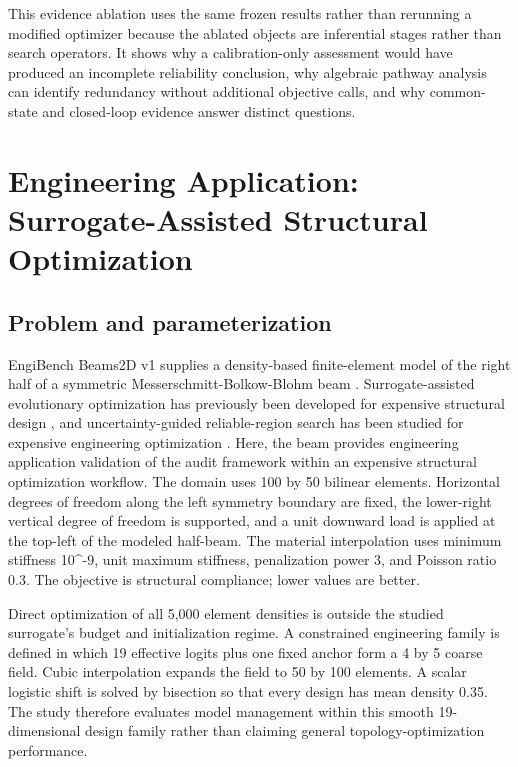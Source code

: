 \documentclass[]{interact}
\begin{document}
\endgroup

This evidence ablation uses the same frozen results rather than rerunning a modified optimizer because the ablated objects are inferential stages rather than search operators. It shows why a calibration-only assessment would have produced an incomplete reliability conclusion, why algebraic pathway analysis can identify redundancy without additional objective calls, and why common-state and closed-loop evidence answer distinct questions.

\hypertarget{engineering-application-surrogate-assisted-structural-optimization}{%
\section{Engineering Application: Surrogate-Assisted Structural Optimization}\label{engineering-application-surrogate-assisted-structural-optimization}}

\hypertarget{problem-and-parameterization}{%
\subsection{Problem and parameterization}\label{problem-and-parameterization}}

EngiBench Beams2D v1 supplies a density-based finite-element model of the right half of a symmetric Messerschmitt-Bolkow-Blohm beam \citep{ref23}. Surrogate-assisted evolutionary optimization has previously been developed for expensive structural design \citep{ref18}, and uncertainty-guided reliable-region search has been studied for expensive engineering optimization \citep{ref35}. Here, the beam provides engineering application validation of the audit framework within an expensive structural optimization workflow. The domain uses 100 by 50 bilinear elements. Horizontal degrees of freedom along the left symmetry boundary are fixed, the lower-right vertical degree of freedom is supported, and a unit downward load is applied at the top-left of the modeled half-beam. The material interpolation uses minimum stiffness 10\^{}-9, unit maximum stiffness, penalization power 3, and Poisson ratio 0.3. The objective is structural compliance; lower values are better.

Direct optimization of all 5,000 element densities is outside the studied surrogate's budget and initialization regime. A constrained engineering family is defined in which 19 effective logits plus one fixed anchor form a 4 by 5 coarse field. Cubic interpolation expands the field to 50 by 100 elements. A scalar logistic shift is solved by bisection so that every design has mean density 0.35. The study therefore evaluates model management within this smooth 19-dimensional design family rather than claiming general topology-optimization performance.
\end{document}
